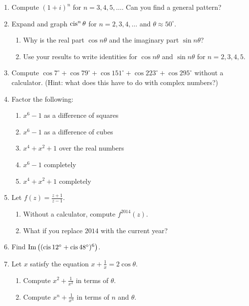 \documentclass[../gatm.tex]{subfiles}
\begin{document}
\begin{enumerate}
\item Compute $(1+i)^n$ for $n=3,4,5,\ldots$. Can you find a general pattern? %
\item Expand and graph $\operatorname{cis}^n \theta$ for $n=2,3,4,\ldots$ and $\theta\approx 50^\circ$. %

\begin{enumerate}
\item Why is the real part $\cos n\theta$ and the imaginary part $\sin n\theta$? %
\item Use your results to write identities for $\cos n\theta$ and $\sin n\theta$ for $n=2,3,4,5$. %
\end{enumerate}

\newcommand{\cosdeg}[1] {\cos #1^\circ}

\item Compute $\cosdeg{7} + \cosdeg{79} + \cosdeg{151} + \cosdeg{223} + \cosdeg{295}$ without a calculator. (Hint: what does this have to do with complex numbers?) %
\item Factor the following: %
\begin{multicols}{2}
\begin{enumerate}
\item $x^6-1$ as a difference of squares %
\item $x^6-1$ as a difference of cubes %
\item $x^4+x^2+1$ over the real numbers %
\item $x^6-1$ completely %
\item $x^4+x^2+1$ completely %
\end{enumerate}
\end{multicols}

\item Let $f(z)=\frac{z+1}{z-1}$. %
\begin{enumerate}
\item Without a calculator, compute $f^{2014}(z)$. %
\item What if you replace $2014$ with the current year? %
\end{enumerate}

\item Find $\operatorname{Im}\left((\operatorname{cis} 12^\circ + \operatorname{cis} 48^\circ)^6\right)$. %

\item Let $x$ satisfy the equation $x+\frac{1}{x}=2\cos\theta$. %
\begin{enumerate}
\item Compute $x^2+\frac{1}{x^2}$ in terms of $\theta$. %
\item Compute $x^n+\frac{1}{x^n}$ in terms of $n$ and $\theta$. %
\end{enumerate}
\end{enumerate}
\end{document}
